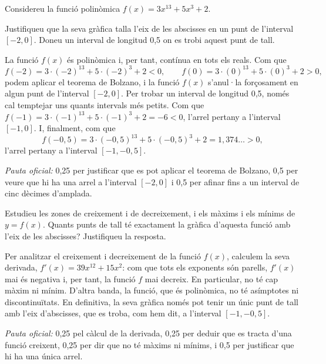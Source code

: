 Considereu la funció polinòmica $f(x)=3x^{13}+5x^3+2$.

\begin{apartats}

Justifiqueu que la seva gràfica talla l'eix de les abscisses en un punt de l'interval $[-2,0]$. Doneu un
interval de longitud 0,5 on es trobi aquest punt de tall.

\begin{solucio}
La funció $f(x)$ és polinòmica i, per tant, contínua en tots els reals. Com que
\[
f(-2)=3\cdot(-2)^{13}+5\cdot(-2)^3+2<0,\qquad f(0)=3\cdot(0)^{13}+5\cdot(0)^3+2>0,
\]
podem aplicar el teorema de Bolzano, i la funció $f(x)$ s'anul·la forçosament en algun punt de l'interval
$[-2,0]$. Per trobar un interval de longitud 0,5, només cal temptejar uns quants intervals més petits. Com que
$f(-1)=3\cdot(-1)^{13}+5\cdot(-1)^3+2=-6<0$, l'arrel pertany a l'interval $[-1,0]$. I, finalment, com que
\[
f(-0{,}5)=3\cdot(-0{,}5)^{13}+5\cdot(-0{,}5)^3+2=1{,}374\ldots>0,
\]
l'arrel pertany a l'interval $[-1,-0{,}5]$.

\textit{Pauta oficial:} 0,25 per justificar que es pot aplicar el teorema de Bolzano, 0,5 per veure que hi ha
una arrel a l'interval $[-2,0]$ i 0,5 per afinar fins a un interval de cinc dècimes d'amplada.
\end{solucio}

Estudieu les zones de creixement i de decreixement, i els màxims i els mínims de $y=f(x)$. Quants punts de
tall té exactament la gràfica d'aquesta funció amb l'eix de les abscisses? Justifiqueu la resposta.

\begin{solucio}
Per analitzar el creixement i decreixement de la funció $f(x)$, calculem la seva derivada,
$f'(x)=39x^{12}+15x^2$: com que tots els exponents són parells, $f'(x)$ mai és negativa i, per tant, la funció
$f$ mai decreix. En particular, no té cap màxim ni mínim. D'altra banda, la funció, que és polinòmica, no té
asímptotes ni discontinuïtats. En definitiva, la seva gràfica només pot tenir un únic punt de tall amb l'eix
d'abscisses, que es troba, com hem dit, a l'interval $[-1,-0{,}5]$.

\textit{Pauta oficial:} 0,25 pel càlcul de la derivada, 0,25 per deduir que es tracta d'una funció creixent,
0,25 per dir que no té màxims ni mínims, i 0,5 per justificar que hi ha una única arrel.
\end{solucio}

\end{apartats}
